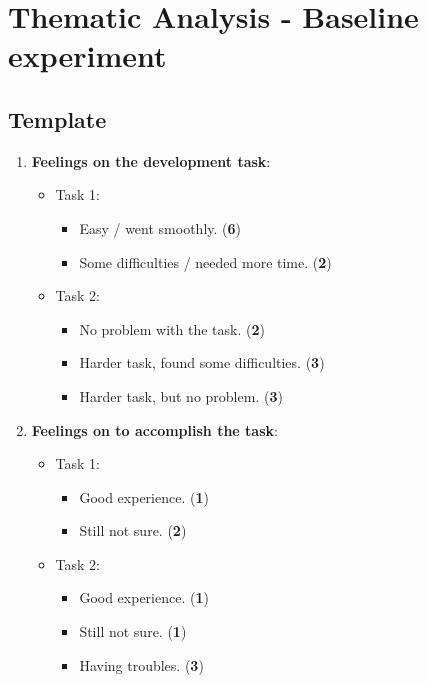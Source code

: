\chapter{Thematic Analysis - Baseline experiment}
\label{appendix:D_Thematic_Analysis_Baseline}
\section{Template}
\begin{enumerate}
    \item \textbf{Feelings on the development task}:
    \begin{itemize}
        \item Task 1:
        \begin{itemize}
            \item Easy / went smoothly. (\textbf{6})
            \item Some difficulties / needed more time. (\textbf{2})
        \end{itemize}

        \item Task 2:
        \begin{itemize}
            \item No problem with the task. (\textbf{2})
            \item Harder task, found some difficulties. (\textbf{3})
            \item Harder task, but no problem. (\textbf{3})
        \end{itemize}
    \end{itemize}

    \item \textbf{Feelings on \tdd to accomplish the task}:
    \begin{itemize}
        \item Task 1:
        \begin{itemize}
            \item Good experience. (\textbf{1})
            \item Still not sure. (\textbf{2})
        \end{itemize}

        \item Task 2:
        \begin{itemize}
            \item Good experience. (\textbf{1})
            \item Still not sure. (\textbf{1})
            \item Having troubles. (\textbf{3})
        \end{itemize}
    \end{itemize}
    

\end{enumerate}
